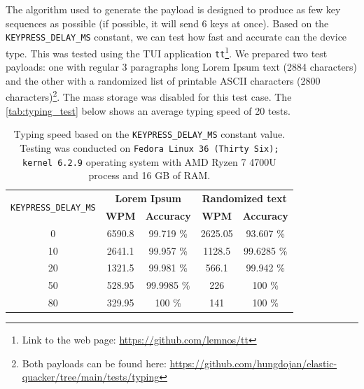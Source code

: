 The algorithm used to generate the payload is designed to produce as few key sequences as possible (if possible, it will send 6 keys at once). Based on the \verb|KEYPRESS_DELAY_MS| constant, we can test how fast and accurate can the device type. This was tested using the TUI application \verb|tt|\footnote{Link to the web page: \url{https://github.com/lemnos/tt}}. We prepared two test payloads: one with regular 3 paragraphs long Lorem Ipsum text (2884 characters) and the other with a randomized list of printable ASCII characters (2800 characters)\footnote{Both payloads can be found here: \url{https://github.com/hungdojan/elastic-quacker/tree/main/tests/typing}}. The mass storage was disabled for this test case. The \autoref{tab:typing_test} below shows an average typing speed of 20 tests.
\begin{table}[ht]
    \centering
    \begin{tabular}{|c|c|c|c|c|} \hline
        \multirow{2}{*}{\texttt{KEYPRESS\_DELAY\_MS}} & \multicolumn{2}{|c|}{\textbf{Lorem Ipsum}} & \multicolumn{2}{|c|}{\textbf{Randomized text}} \\ \cline{2-5}
                                                      & \textbf{WPM} &           \textbf{Accuracy} & \textbf{WPM} &               \textbf{Accuracy} \\ \hline
                                                    0 &       6590.8 &                   99.719 \% &      2625.05 &                      93.607 \%  \\ \hline
                                                   10 &       2641.1 &                   99.957 \% &       1128.5 &                     99.6285 \%  \\ \hline
                                                   20 &       1321.5 &                   99.981 \% &        566.1 &                      99.942 \%  \\ \hline
                                                   50 &       528.95 &                  99.9985 \% &          226 &                         100 \%  \\ \hline
                                                   80 &       329.95 &                      100 \% &          141 &                         100 \%  \\ \hline
    \end{tabular}
    \caption{Typing speed based on the \texttt{KEYPRESS\_DELAY\_MS} constant value. Testing was conducted on \texttt{Fedora Linux 36 (Thirty Six); kernel 6.2.9} operating system with AMD Ryzen 7 4700U process and 16 GB of RAM.}
    \label{tab:typing_test}
\end{table}
